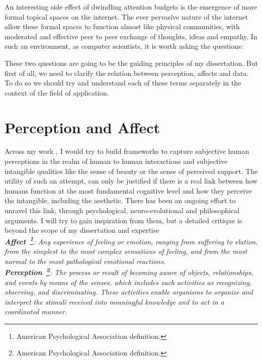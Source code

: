 An interesting side effect of dwindling attention budgets is the emergence of more formal topical spaces on the internet. The ever pervasive nature of the internet allow these formal spaces to function almost like physical communities, with moderated and effective peer to peer exchange of thoughts, ideas and empathy\cite{kummervold2002social,squire2015should,hwang2010social}.
In such an environment, as computer scientists, it is worth asking the questions:


\noindent{}

\vspace{1cm}
These two questions are going to be the guiding principles of my dissertation. But first of all, we need to clarify the relation between perception, affects and data. To do so we should try and understand each of these terms separately in the context of the field of application.

\section{Perception and Affect}
Across my work , I would try to build frameworks to capture subjective human perceptions in the realm of human to human interactions and subjective intangible qualities like the sense of beauty or the sense of perceived support. The utility of such an attempt, can only be justified if there is a real link between how humans function at the most fundamental cognitive level and how they perceive the intangible, including the aesthetic. There has been an ongoing effort to unravel this link, through psychological, neuro-evolutional and philosophical arguments. I will try to gain inspiration from them, but a detailed critique is beyond the scope of my dissertation and expertise\\
\textsl{\textbf{Affect~\footnote{American Psychological Association definition.}}: Any experience of feeling or emotion, ranging from suffering to elation, from the simplest to the most complex sensations of feeling, and from the most normal to the most pathological emotional reactions.}\\
\textsl{\textbf{Perception~\footnote{American Psychological Association definition.}}: The process or result of becoming aware of objects, relationships, and events by means of the senses, which includes such activities as recognizing, observing, and discriminating. These activities enable organisms to organize and interpret the stimuli received into meaningful knowledge and to act in a coordinated manner.}\\


